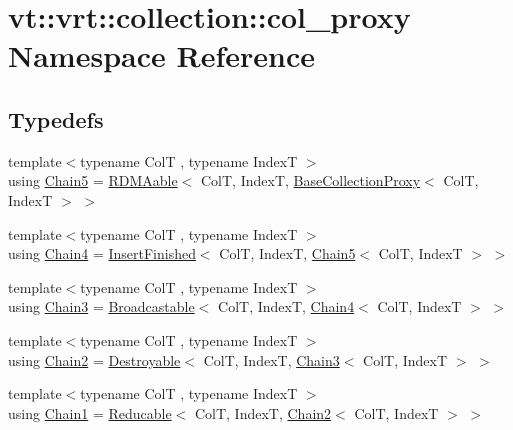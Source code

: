 \hypertarget{namespacevt_1_1vrt_1_1collection_1_1col__proxy}{}\section{vt\+:\+:vrt\+:\+:collection\+:\+:col\+\_\+proxy Namespace Reference}
\label{namespacevt_1_1vrt_1_1collection_1_1col__proxy}
\subsection*{Typedefs}
\begin{DoxyCompactItemize}
\item 
{\footnotesize template$<$typename ColT , typename IndexT $>$ }\\using \hyperlink{namespacevt_1_1vrt_1_1collection_1_1col__proxy_a96685f5884d57269c5c7dfe14dcc361b}{Chain5} = \hyperlink{structvt_1_1vrt_1_1collection_1_1_r_d_m_aable}{R\+D\+M\+Aable}$<$ ColT, IndexT, \hyperlink{structvt_1_1vrt_1_1collection_1_1_base_collection_proxy}{Base\+Collection\+Proxy}$<$ ColT, IndexT $>$ $>$
\item 
{\footnotesize template$<$typename ColT , typename IndexT $>$ }\\using \hyperlink{namespacevt_1_1vrt_1_1collection_1_1col__proxy_a6fce621c93c2418be67c83af0d94d68f}{Chain4} = \hyperlink{structvt_1_1vrt_1_1collection_1_1_insert_finished}{Insert\+Finished}$<$ ColT, IndexT, \hyperlink{namespacevt_1_1vrt_1_1collection_1_1col__proxy_a96685f5884d57269c5c7dfe14dcc361b}{Chain5}$<$ ColT, IndexT $>$ $>$
\item 
{\footnotesize template$<$typename ColT , typename IndexT $>$ }\\using \hyperlink{namespacevt_1_1vrt_1_1collection_1_1col__proxy_aa83ea97afbf21f975d02b933af0ee42c}{Chain3} = \hyperlink{structvt_1_1vrt_1_1collection_1_1_broadcastable}{Broadcastable}$<$ ColT, IndexT, \hyperlink{namespacevt_1_1vrt_1_1collection_1_1col__proxy_a6fce621c93c2418be67c83af0d94d68f}{Chain4}$<$ ColT, IndexT $>$ $>$
\item 
{\footnotesize template$<$typename ColT , typename IndexT $>$ }\\using \hyperlink{namespacevt_1_1vrt_1_1collection_1_1col__proxy_a0c21e18852e5deea513629fe02399bb5}{Chain2} = \hyperlink{structvt_1_1vrt_1_1collection_1_1_destroyable}{Destroyable}$<$ ColT, IndexT, \hyperlink{namespacevt_1_1vrt_1_1collection_1_1col__proxy_aa83ea97afbf21f975d02b933af0ee42c}{Chain3}$<$ ColT, IndexT $>$ $>$
\item 
{\footnotesize template$<$typename ColT , typename IndexT $>$ }\\using \hyperlink{namespacevt_1_1vrt_1_1collection_1_1col__proxy_a829dc1f247cb9518d83ccfb6ca9158a9}{Chain1} = \hyperlink{structvt_1_1vrt_1_1collection_1_1_reducable}{Reducable}$<$ ColT, IndexT, \hyperlink{namespacevt_1_1vrt_1_1collection_1_1col__proxy_a0c21e18852e5deea513629fe02399bb5}{Chain2}$<$ ColT, IndexT $>$ $>$
\end{DoxyCompactItemize}


